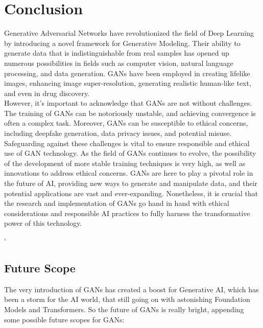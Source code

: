 \chapter{Conclusion}

\noindent 
Generative Adversarial Networks have revolutionized the field of Deep Learning by introducing a novel framework for Generative Modeling. Their ability to generate data that is indistinguishable from real samples has opened up numerous possibilities in fields such as computer vision, natural language processing, and data generation. GANs have been employed in creating lifelike images, enhancing image super-resolution, generating realistic human-like text, and even in drug discovery.\\

\noindent
However, it's important to acknowledge that GANs are not without challenges. The training of GANs can be notoriously unstable, and achieving convergence is often a complex task. Moreover, GANs can be susceptible to ethical concerns, including deepfake generation, data privacy issues, and potential misuse. Safeguarding against these challenges is vital to ensure responsible and ethical use of GAN technology. As the field of GANs continues to evolve, the possibility of the development of more stable training techniques is very high, as well as innovations to address ethical concerns. GANs are here to play a pivotal role in the future of AI, providing new ways to generate and manipulate data, and their potential applications are vast and ever-expanding. Nonetheless, it is crucial that the research and implementation of GANs go hand in hand with ethical considerations and responsible AI practices to fully harness the transformative power of this technology.

\clearpage`

\section{Future Scope}

\noindent
The very introduction of GANs has created a boost for Generative AI, which has been a storm for the AI world, that still going on with astonishing Foundation Models and Transformers. So the future of GANs is really bright, appending some possible future scopes for GANs:

